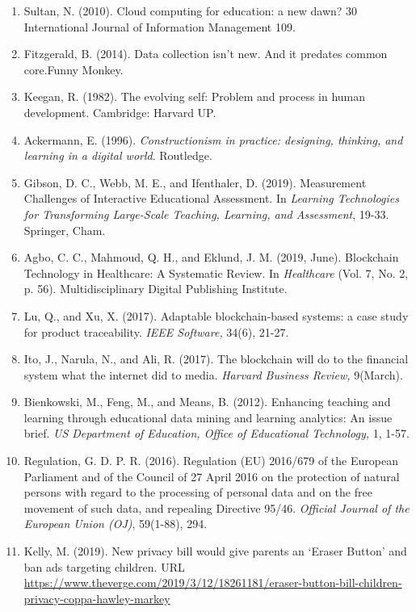 \documentclass{article}
\begin{document}
\begin{enumerate}
    \label{sec:12}
    \item Sultan, N. (2010). Cloud computing for education: a new dawn? 30 International Journal of Information Management  109.
    \label{sec:13}
    \item Fitzgerald, B. (2014). Data collection isn't new. And it predates common core.Funny Monkey.
    \label{sec:14}
    \item Keegan, R. (1982). The evolving self: Problem and process in human development. Cambridge: Harvard UP.
    \label{sec:15}
    \item Ackermann, E. (1996). \textit{Constructionism in practice: designing, thinking, and learning in a digital world}. Routledge.
    \label{sec:16}
    \item Gibson, D. C., Webb, M. E., and Ifenthaler, D. (2019). Measurement Challenges of Interactive Educational Assessment. In \textit{Learning Technologies for Transforming Large-Scale Teaching, Learning, and Assessment}, 19-33. Springer, Cham.
    \label{sec:17}
    \item Agbo, C. C., Mahmoud, Q. H., and Eklund, J. M. (2019, June). Blockchain Technology in Healthcare: A Systematic Review. In \textit{Healthcare} (Vol. 7, No. 2, p. 56). Multidisciplinary Digital Publishing Institute.
    \label{sec:18}
    \item Lu, Q., and Xu, X. (2017). Adaptable blockchain-based systems: a case study for product traceability. \textit{IEEE Software,} 34(6), 21-27.
    \label{sec:19}
    \item Ito, J., Narula, N., and Ali, R. (2017). The blockchain will do to the financial system what the internet did to media. \textit{Harvard Business Review,} 9(March).
    \label{sec:20}
    \item Bienkowski, M., Feng, M., and Means, B. (2012). Enhancing teaching and learning through educational data mining and learning analytics: An issue brief. \textit{US Department of Education, Office of Educational Technology,} 1, 1-57. 
    \label{sec:21}
    \item Regulation, G. D. P. R. (2016). Regulation (EU) 2016/679 of the European Parliament and of the Council of 27 April 2016 on the protection of natural persons with regard to the processing of personal data and on the free movement of such data, and repealing Directive 95/46. \textit{Official Journal of the European Union (OJ)}, 59(1-88), 294.
    \label{sec:22}
    \item Kelly, M. (2019). New privacy bill would give parents an ‘Eraser Button’ and ban ads targeting children. URL \url{https://www.theverge.com/2019/3/12/18261181/eraser-button-bill-children-privacy-coppa-hawley-markey}

\end{enumerate}
\end{document}
